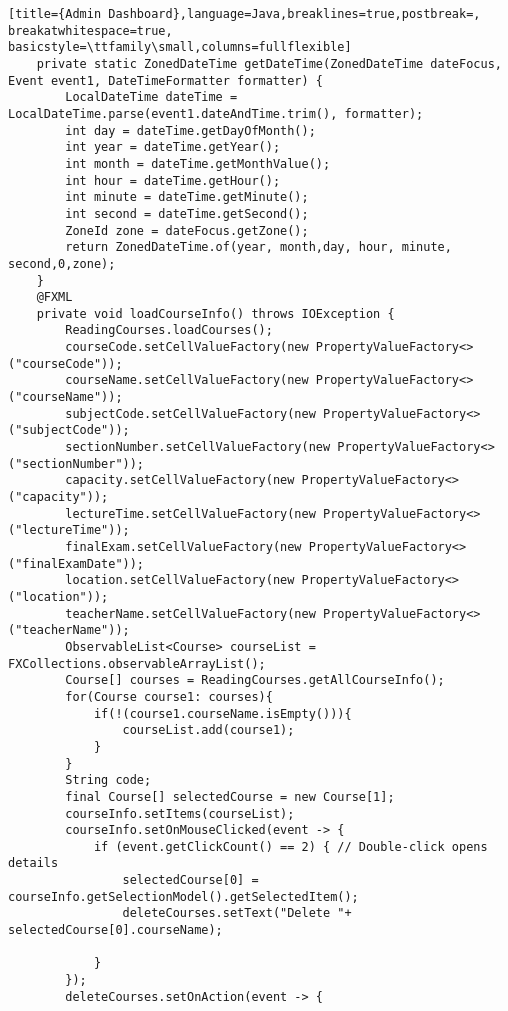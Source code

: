 \begin{lstlisting}[title={Admin Dashboard},language=Java,breaklines=true,postbreak=, breakatwhitespace=true, basicstyle=\ttfamily\small,columns=fullflexible]
    private static ZonedDateTime getDateTime(ZonedDateTime dateFocus, Event event1, DateTimeFormatter formatter) {
        LocalDateTime dateTime = LocalDateTime.parse(event1.dateAndTime.trim(), formatter);
        int day = dateTime.getDayOfMonth();
        int year = dateTime.getYear();
        int month = dateTime.getMonthValue();
        int hour = dateTime.getHour();
        int minute = dateTime.getMinute();
        int second = dateTime.getSecond();
        ZoneId zone = dateFocus.getZone();
        return ZonedDateTime.of(year, month,day, hour, minute, second,0,zone);
    }
    @FXML
    private void loadCourseInfo() throws IOException {
        ReadingCourses.loadCourses();
        courseCode.setCellValueFactory(new PropertyValueFactory<>("courseCode"));
        courseName.setCellValueFactory(new PropertyValueFactory<>("courseName"));
        subjectCode.setCellValueFactory(new PropertyValueFactory<>("subjectCode"));
        sectionNumber.setCellValueFactory(new PropertyValueFactory<>("sectionNumber"));
        capacity.setCellValueFactory(new PropertyValueFactory<>("capacity"));
        lectureTime.setCellValueFactory(new PropertyValueFactory<>("lectureTime"));
        finalExam.setCellValueFactory(new PropertyValueFactory<>("finalExamDate"));
        location.setCellValueFactory(new PropertyValueFactory<>("location"));
        teacherName.setCellValueFactory(new PropertyValueFactory<>("teacherName"));
        ObservableList<Course> courseList = FXCollections.observableArrayList();
        Course[] courses = ReadingCourses.getAllCourseInfo();
        for(Course course1: courses){
            if(!(course1.courseName.isEmpty())){
                courseList.add(course1);
            }
        }
        String code;
        final Course[] selectedCourse = new Course[1];
        courseInfo.setItems(courseList);
        courseInfo.setOnMouseClicked(event -> {
            if (event.getClickCount() == 2) { // Double-click opens details
                selectedCourse[0] = courseInfo.getSelectionModel().getSelectedItem();
                deleteCourses.setText("Delete "+ selectedCourse[0].courseName);

            }
        });
        deleteCourses.setOnAction(event -> {


\end{lstlisting}

